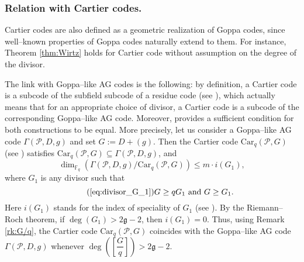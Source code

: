 \documentclass[a4paper]{amsart}
\theoremstyle{definition}
\theoremstyle{remark}
\newcommand{\calP}{\mathcal{P}}
\newcommand{\fq}{\mathbb{F}_{q}}
\begin{document}
\subsubsection{Relation with Cartier codes.} Cartier codes \cite{Cou14} are also defined as a geometric realization of Goppa codes, since well--known properties of Goppa codes naturally extend to them. For instance, Theorem \ref{thm:Wirtz} holds for Cartier code without assumption on the degree of the divisor.

The link with Goppa--like AG codes is the following: by definition, a Cartier code is a subcode of the subfield subcode of a residue code (see \cite[Proposition 4.3]{Cou14}), which actually means that for an appropriate choice of divisor, a Cartier code is a subcode of the corresponding Goppa--like AG code. Moreover, \cite[Theorem 5.1]{Cou14} provides a sufficient condition for both constructions to be equal. More precisely, let us consider a Goppa--like AG code $\Gamma(\calP,D,g)$  and set $G := D+(g)$. Then the Cartier code $\mathrm{Car}_q(\calP,G)$ (see \cite[Definition 4.2]{Cou14}) satisfies $\mathrm{Car}_q(\calP,G) \subseteq \Gamma(\calP,D,g)$, and 
$$ \dim_{\fq} \left( \Gamma(\calP,D,g)/ \mathrm{Car}_q(\calP,G)\right) \leq m \cdot i(G_1),$$
where $G_1$ is any divisor such that 
\begin{equation} \tag{\ref{eq:divisor_G_1}}
G \geq qG_1 \ \mathrm{and} \ G \geq G_1.
\end{equation}
 Here $i(G_1)$ stands for the index of speciality of $G_1$ (see \cite[Definition~1.6.10]{Sti09}). By the Riemann--Roch theorem, if $\deg(G_1) > 2\mathfrak{g}-2$, then $i(G_1) =0.$ 
Thus, using Remark \ref{rk:G/q}, the Cartier code $\mathrm{Car}_q(\calP,G)$ coincides with the Goppa--like AG code $\Gamma(\calP,D,g)$ whenever $\deg\left(\left[\dfrac{G}{q} \right]\right) > 2\mathfrak{g}-2$. 
\end{document}

